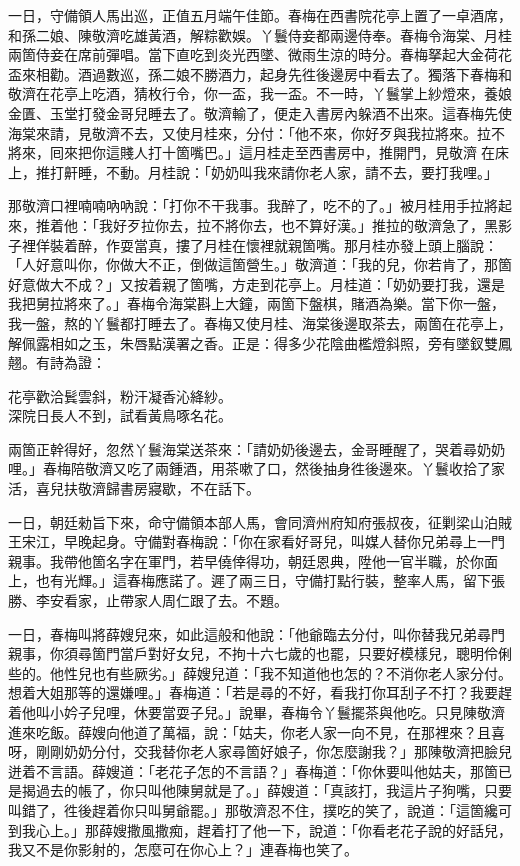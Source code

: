 一日，守備領人馬出巡，正值五月端午佳節。春梅在西書院花亭上置了一卓酒席，和孫二娘、陳敬濟吃雄黃酒，解粽歡娛。{}丫鬟侍妾都兩邊侍奉。春梅令海棠、月桂兩箇侍妾在席前彈唱。當下直吃到炎光西墜、微雨生涼的時分。春梅拏起大金荷花盃來相勸。酒過數巡，孫二娘不勝酒力，起身先徃後邊房中看去了。獨落下春梅和敬濟在花亭上吃酒，猜枚行令，你一盃，我一盃。不一時，丫鬟掌上紗燈來，養娘金匱、玉堂打發金哥兒睡去了。敬濟輸了，便走入書房內躲酒不出來。這春梅先使海棠來請，見敬濟不去，又使月桂來，分付：「他不來，你好歹與我拉將來。拉不將來，囘來把你這賤人打十箇嘴巴。」這月桂走至西書房中，推開門，見敬濟𢱉在床上，推打鼾睡，不動。月桂說：「奶奶叫我來請你老人家，請不去，要打我哩。」

那敬濟口裡喃喃吶吶說：「打你不干我事。{}我醉了，吃不的了。」被月桂用手拉將起來，推着他：「我好歹拉你去，拉不將你去，也不算好漢。」推拉的敬濟急了，黑影子裡佯裝着醉，作耍當真，摟了月桂在懷裡就親箇嘴。那月桂亦發上頭上腦說：「人好意叫你，你做大不正，倒做這箇營生。」敬濟道：「我的兒，你若肯了，那箇好意做大不成？」又按着親了箇嘴，方走到花亭上。月桂道：「奶奶要打我，還是我把舅拉將來了。」春梅令海棠斟上大鐘，兩箇下盤棋，賭酒為樂。當下你一盤，我一盤，熬的丫鬟都打睡去了。春梅又使月桂、海棠後邊取茶去，兩箇在花亭上，解佩露相如之玉，朱唇點漢署之香。正是：得多少花陰曲檻燈斜照，旁有墜釵雙鳳翹。有詩為證：

\begin{myquote}
花亭歡洽鬂雲斜，粉汗凝香沁絳紗。\\深院日長人不到，試看黃鳥啄名花。
\end{myquote}

兩箇正幹得好，忽然丫鬟海棠送茶來：「請奶奶後邊去，金哥睡醒了，哭着尋奶奶哩。」春梅陪敬濟又吃了兩鍾酒，用茶嗽了口，然後抽身徃後邊來。丫鬟收拾了家活，喜兒扶敬濟歸書房寢歇，不在話下。

一日，朝廷勑旨下來，命守備領本部人馬，會同濟州府知府張叔夜，征剿梁山泊賊王宋江，早晚起身。守備對春梅說：「你在家看好哥兒，叫媒人替你兄弟尋上一門親事。我帶他箇名字在軍門，若早僥倖得功，朝廷恩典，陞他一官半職，於你面上，也有光輝。」{}這春梅應諾了。遲了兩三日，守備打點行裝，整率人馬，留下張勝、李安看家，止帶家人周仁跟了去。不題。

一日，春梅叫將薛嫂兒來，如此這般和他說：「他爺臨去分付，叫你替我兄弟尋門親事，你須尋箇門當戶對好女兒，不拘十六七歲的也罷，只要好模樣兒，聰明伶俐些的。他性兒也有些厥劣。」薛嫂兒道：「我不知道他也怎的？不消你老人家分付。想着大姐那等的還嫌哩。」春梅道：「若是尋的不好，看我打你耳刮子不打？我要趕着他叫小妗子兒哩，休要當耍子兒。」說畢，春梅令丫鬟擺茶與他吃。只見陳敬濟進來吃飯。薛嫂向他道了萬福，說：「姑夫，你老人家一向不見，在那裡來？且喜呀，剛剛奶奶分付，交我替你老人家尋箇好娘子，你怎麼謝我？」那陳敬濟把臉兒迸着不言語。{}薛嫂道：「老花子怎的不言語？」春梅道：「你休要叫他姑夫，那箇已是揭過去的帳了，你只叫他陳舅就是了。」薛嫂道：「真該打，我這片子狗嘴，只要叫錯了，徃後趕着你只叫舅爺罷。」那敬濟忍不住，撲吃的笑了，說道：「這箇纔可到我心上。」{}那薛嫂撒風撒痴，趕着打了他一下，說道：「你看老花子說的好話兒，我又不是你影射的，怎麼可在你心上？」連春梅也笑了。

